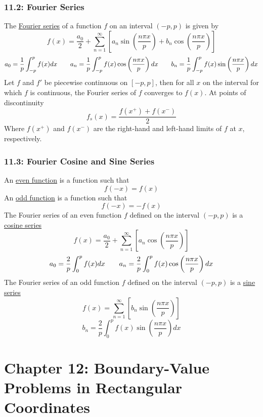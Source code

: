 \documentclass{article}
\begin{document}
\section*{11.2: Fourier Series}
The \underline{Fourier series} of a function \(f\) on an interval \((-p, p)\) is given by
\[f(x)=\frac{a_0}{2}+\sum_{n=1}^\infty\left[a_n\sin\left(\frac{n\pi x}{p}\right)+b_n\cos\left(\frac{n\pi x}{p}\right)\right]\]
\[a_0=\frac{1}{p}\int_{-p}^pf(x)dx\hspace{7 mm}a_n=\frac{1}{p}\int_{-p}^pf(x)\cos\left(\frac{n\pi x}{p}\right)dx\hspace{7 mm}b_n=\frac{1}{p}\int_{-p}^pf(x)\sin\left(\frac{n\pi x}{p}\right)dx\]
Let \(f\) and \(f'\) be piecewise continuous on \([-p, p]\), then for all \(x\) on the interval for which \(f\) is continuous, the Fourier series of \(f\) converges to \(f(x)\). At points of discontinuity
\[f_s(x)=\frac{f(x^+)+f(x^-)}{2}\]
Where \(f(x^+)\) and \(f(x^-)\) are the right-hand and left-hand limits of \(f\) at \(x\), respectively.
\section*{11.3: Fourier Cosine and Sine Series}
An \underline{even function} is a function such that
\[f(-x)=f(x)\]
An \underline{odd function} is a function such that
\[f(-x)=-f(x)\]
The Fourier series of an even function \(f\) defined on the interval \((-p, p)\) is a \underline{cosine series}
\[f(x)=\frac{a_0}{2}+\sum_{n=1}^\infty\left[a_n\cos\left(\frac{n\pi x}{p}\right)\right]\]
\[a_0=\frac{2}{p}\int_{0}^pf(x)dx\hspace{7 mm}a_n=\frac{2}{p}\int_{0}^pf(x)\cos\left(\frac{n\pi x}{p}\right)dx\]
The Fourier series of an odd function \(f\) defined on the interval \((-p, p)\) is a \underline{sine series}
\[f(x)=\sum_{n=1}^\infty\left[b_n\sin\left(\frac{n\pi x}{p}\right)\right]\]
\[b_n=\frac{2}{p}\int_{0}^pf(x)\sin\left(\frac{n\pi x}{p}\right)dx\]
\part*{Chapter 12: Boundary-Value Problems in Rectangular Coordinates}
\end{document}
